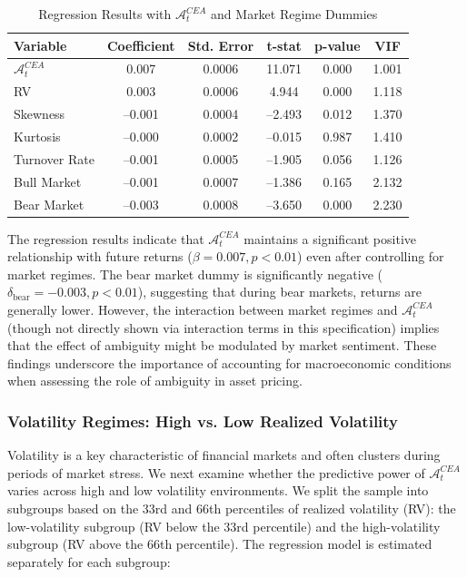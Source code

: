 \documentclass[preprint,12pt,authoryear]{elsarticle}
\begin{document}
\begin{table}[h!]
\centering
\caption{Regression Results with \(\mathcal{A}^{CEA}_t\) and Market Regime Dummies}
\label{tab:ambmp_regression_results}
\begin{tabularx}{\textwidth}{Xccccc}
\toprule
\textbf{Variable} & \textbf{Coefficient} & \textbf{Std. Error} & \textbf{t-stat} & \textbf{p-value} & \textbf{VIF} \\
\midrule
\(\mathcal{A}^{CEA}_t\) & 0.007 & 0.0006 & 11.071 & 0.000 & 1.001 \\
RV & 0.003 & 0.0006 & 4.944 & 0.000 & 1.118 \\
Skewness & –0.001 & 0.0004 & –2.493 & 0.012 & 1.370 \\
Kurtosis & –0.000 & 0.0002 & –0.015 & 0.987 & 1.410 \\
Turnover Rate & –0.001 & 0.0005 & –1.905 & 0.056 & 1.126 \\
Bull Market & –0.001 & 0.0007 & –1.386 & 0.165 & 2.132 \\
Bear Market & –0.003 & 0.0008 & –3.650 & 0.000 & 2.230 \\
\bottomrule
\end{tabularx}
\end{table}

The regression results indicate that $\mathcal{A}^{CEA}_t$ maintains a significant positive relationship with future returns ($\beta = 0.007, p < 0.01$) even after controlling for market regimes. The bear market dummy is significantly negative ($\delta_{\text{bear}} = -0.003, p < 0.01$), suggesting that during bear markets, returns are generally lower. However, the interaction between market regimes and $\mathcal{A}^{CEA}_t$ (though not directly shown via interaction terms in this specification) implies that the effect of ambiguity might be modulated by market sentiment. These findings underscore the importance of accounting for macroeconomic conditions when assessing the role of ambiguity in asset pricing.

\subsubsection{Volatility Regimes: High vs. Low Realized Volatility} \label{subsec:volatility_regimes}

Volatility is a key characteristic of financial markets and often clusters during periods of market stress. We next examine whether the predictive power of $\mathcal{A}^{CEA}_t$ varies across high and low volatility environments. We split the sample into subgroups based on the 33rd and 66th percentiles of realized volatility (RV): the low-volatility subgroup (RV below the 33rd percentile) and the high-volatility subgroup (RV above the 66th percentile). The regression model is estimated separately for each subgroup:
\end{document}
